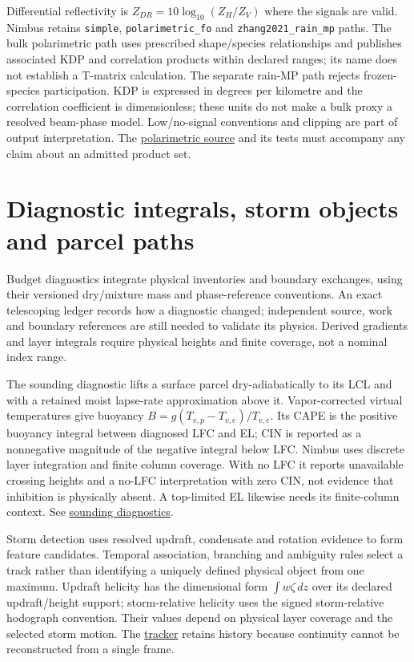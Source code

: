 Differential reflectivity is $Z_{DR}=10\log_{10}(Z_H/Z_V)$ where the signals
are valid. Nimbus retains \texttt{simple}, \texttt{polarimetric\_fo} and
\texttt{zhang2021\_rain\_mp} paths. The bulk polarimetric path uses prescribed
shape/species relationships and publishes associated KDP and correlation
products within declared ranges; its name does not establish a T-matrix
calculation. The separate rain-MP path rejects frozen-species participation.
KDP is expressed in degrees per kilometre and the correlation coefficient is
dimensionless; these units do not make a bulk proxy a resolved beam-phase model.
Low/no-signal conventions and clipping are part of output interpretation.
The \href{../src/radar/schemes/zdr/zdr.cpp}{polarimetric source} and its tests
must accompany any claim about an admitted product set.

\section{Diagnostic integrals, storm objects and parcel paths}

Budget diagnostics integrate physical inventories and boundary exchanges,
using their versioned dry/mixture mass and phase-reference conventions. An
exact telescoping ledger records how a diagnostic changed; independent source,
work and boundary references are still needed to validate its physics.
Derived gradients and layer integrals require physical heights and finite
coverage, not a nominal index range.

The sounding diagnostic lifts a surface parcel dry-adiabatically to its LCL
and with a retained moist lapse-rate approximation above it. Vapor-corrected
virtual temperatures give buoyancy
$B=g(T_{v,p}-T_{v,e})/T_{v,e}$. Its CAPE is the positive buoyancy integral
between diagnosed LFC and EL; CIN is reported as a nonnegative magnitude of
the negative integral below LFC. Nimbus uses discrete layer integration and
finite column coverage. With no LFC it reports unavailable crossing heights
and a no-LFC interpretation with zero CIN, not evidence that inhibition is
physically absent. A top-limited EL likewise needs its finite-column context.
See \href{../src/init/sounding/diagnostics.cpp}{sounding diagnostics}.

Storm detection uses resolved updraft, condensate and rotation evidence to form
feature candidates. Temporal association, branching and ambiguity rules select
a track rather than identifying a uniquely defined physical object from one
maximum. Updraft helicity has the dimensional form $\int w\zeta\,dz$ over its
declared updraft/height support; storm-relative helicity uses the signed
storm-relative hodograph convention. Their values depend on physical layer
coverage and the selected storm motion. The
\href{../src/diagnostics/storm_tracker.cpp}{tracker} retains history because
continuity cannot be reconstructed from a single frame.

